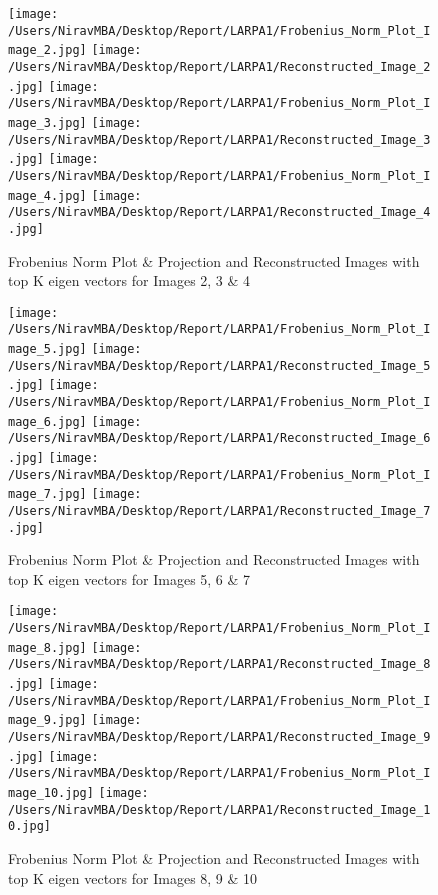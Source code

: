 \documentclass[12pt]{report}
\begin{document}
\begin{figure}[H]

	\texttt{[image: /Users/NiravMBA/Desktop/Report/LARPA1/Frobenius\_Norm\_Plot\_Image\_2.jpg]}
	\texttt{[image: /Users/NiravMBA/Desktop/Report/LARPA1/Reconstructed\_Image\_2.jpg]}
	\texttt{[image: /Users/NiravMBA/Desktop/Report/LARPA1/Frobenius\_Norm\_Plot\_Image\_3.jpg]}
	\texttt{[image: /Users/NiravMBA/Desktop/Report/LARPA1/Reconstructed\_Image\_3.jpg]}
	\texttt{[image: /Users/NiravMBA/Desktop/Report/LARPA1/Frobenius\_Norm\_Plot\_Image\_4.jpg]}
	\texttt{[image: /Users/NiravMBA/Desktop/Report/LARPA1/Reconstructed\_Image\_4.jpg]}
	\caption{Frobenius Norm Plot \& Projection and Reconstructed Images with top K eigen vectors for Images 2, 3 \& 4 }
	
\end{figure}

\begin{figure}[H]


	\texttt{[image: /Users/NiravMBA/Desktop/Report/LARPA1/Frobenius\_Norm\_Plot\_Image\_5.jpg]}
	\texttt{[image: /Users/NiravMBA/Desktop/Report/LARPA1/Reconstructed\_Image\_5.jpg]}
	\texttt{[image: /Users/NiravMBA/Desktop/Report/LARPA1/Frobenius\_Norm\_Plot\_Image\_6.jpg]}
	\texttt{[image: /Users/NiravMBA/Desktop/Report/LARPA1/Reconstructed\_Image\_6.jpg]}
	\texttt{[image: /Users/NiravMBA/Desktop/Report/LARPA1/Frobenius\_Norm\_Plot\_Image\_7.jpg]}
	\texttt{[image: /Users/NiravMBA/Desktop/Report/LARPA1/Reconstructed\_Image\_7.jpg]}
	
	\caption{Frobenius Norm Plot \& Projection and Reconstructed Images with top K eigen vectors for Images 5, 6 \& 7 }
	
\end{figure}

\begin{figure}[H]
	

	\texttt{[image: /Users/NiravMBA/Desktop/Report/LARPA1/Frobenius\_Norm\_Plot\_Image\_8.jpg]}
	\texttt{[image: /Users/NiravMBA/Desktop/Report/LARPA1/Reconstructed\_Image\_8.jpg]}
	\texttt{[image: /Users/NiravMBA/Desktop/Report/LARPA1/Frobenius\_Norm\_Plot\_Image\_9.jpg]}
	\texttt{[image: /Users/NiravMBA/Desktop/Report/LARPA1/Reconstructed\_Image\_9.jpg]}
	\texttt{[image: /Users/NiravMBA/Desktop/Report/LARPA1/Frobenius\_Norm\_Plot\_Image\_10.jpg]}
	\texttt{[image: /Users/NiravMBA/Desktop/Report/LARPA1/Reconstructed\_Image\_10.jpg]}
	\caption{Frobenius Norm Plot \& Projection and Reconstructed Images with top K eigen vectors for Images 8, 9 \& 10 }
	
\end{figure}
\end{document}
